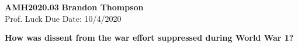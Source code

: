 \noindent
\textbf{AMH2020.03} \hfill \textbf{Brandon Thompson} \\
\normalsize Prof. Luck \hfill Due Date: 10/4/2020 \\

\begin{center}
\textbf{How was dissent from the war effort suppressed during World War 1?}
\end{center}